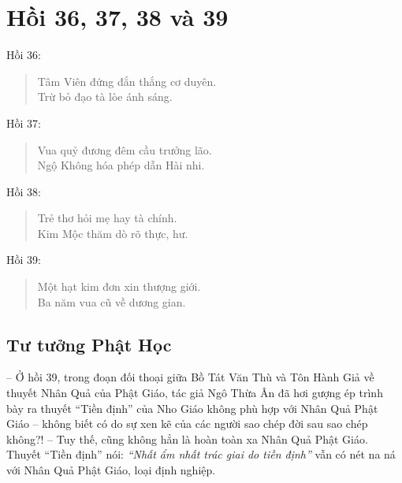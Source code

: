 \chapter{Hồi 36, 37, 38 và 39} %
\label{cha:hoi_36_37}

Hồi 36:

\begin{verse}
\begin{itshape}
Tâm Viên đứng đắn thắng cơ duyên.\\
Trừ bỏ đạo tà lòe ánh sáng.
\end{itshape}
\end{verse}

Hồi 37:

\begin{verse}
\begin{itshape}
Vua quỷ đương đêm cầu trưởng lão.\\
Ngộ Không hóa phép dẫn Hài nhi.
\end{itshape}
\end{verse}

Hồi 38:

\begin{verse}
\begin{itshape}
Trẻ thơ hỏi mẹ hay tà chính.\\
Kim Mộc thăm dò rõ thực, hư.
\end{itshape}
\end{verse}

Hồi 39:

\begin{verse}
\begin{itshape}
Một hạt kim đơn xin thượng giới.\\
Ba năm vua cũ về dương gian.
\end{itshape}
\end{verse}

\section{Tư tưởng Phật Học} %
\label{sec:36_37_phat_hoc}

-- Ở hồi 39, trong đoạn đối thoại giữa Bồ Tát Văn Thù và Tôn Hành Giả về thuyết Nhân Quả của Phật Giáo, tác giả Ngô Thừa Ân đã hơi gượng ép trình bày ra thuyết ``Tiền định'' của Nho Giáo không phù hợp với Nhân Quả Phật Giáo -- không biết có do sự xen kẽ của các người sao chép đời sau sao chép không?! -- Tuy thế, cũng không hẳn là hoàn toàn xa Nhân Quả Phật Giáo. Thuyết ``Tiền định'' nói: \emph{``Nhất ẩm nhất trác giai do tiền định''} vẫn có nét na ná với Nhân Quả Phật Giáo, loại định nghiệp.

